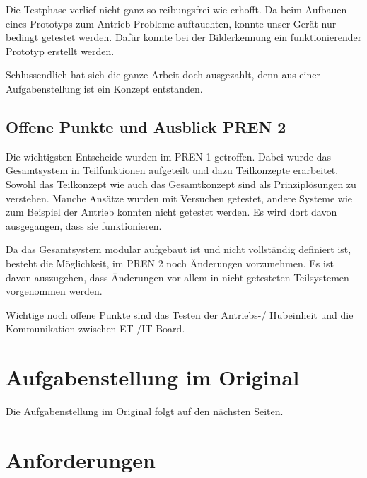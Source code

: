 \documentclass[a4paper]{report}
\begin{document}
Die Testphase verlief nicht ganz so reibungsfrei wie erhofft. Da beim Aufbauen eines Prototyps zum Antrieb Probleme auftauchten, konnte unser Gerät nur bedingt getestet werden. Dafür konnte bei der Bilderkennung ein funktionierender Prototyp erstellt werden.

Schlussendlich hat sich die ganze Arbeit doch ausgezahlt, denn aus einer Aufgabenstellung ist ein Konzept entstanden.

\section{Offene Punkte und Ausblick PREN 2}
\label{sec:Futurama}
Die wichtigsten Entscheide wurden im PREN 1 getroffen. Dabei wurde  das Gesamtsystem in Teilfunktionen aufgeteilt und dazu Teilkonzepte erarbeitet. Sowohl das Teilkonzept wie auch das Gesamtkonzept sind als Prinziplösungen zu verstehen. Manche Ansätze wurden mit Versuchen getestet, andere Systeme wie zum Beispiel der Antrieb konnten nicht getestet werden. Es wird dort davon ausgegangen, dass sie funktionieren.

Da das Gesamtsystem modular aufgebaut ist und nicht vollständig definiert ist, besteht die Möglichkeit, im PREN 2 noch Änderungen vorzunehmen. Es  ist davon auszugehen, dass Änderungen vor allem in nicht getesteten Teilsystemen vorgenommen werden.

Wichtige noch offene Punkte sind das Testen der Antriebs-/ Hubeinheit und die Kommunikation zwischen ET-/IT-Board.

\listoffigures

\listoftables

\printbibliography

\appendix

\chapter{Aufgabenstellung im Original}
\label{app:ch:AufgabenOriginal}
Die Aufgabenstellung im Original folgt auf den nächsten Seiten.



\chapter{Anforderungen}
\label{app:ch:Anforderungen}
\end{document}
